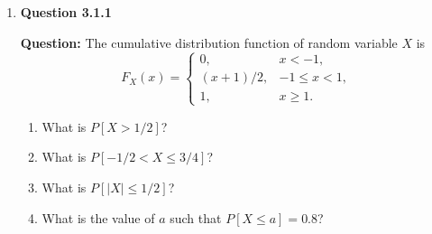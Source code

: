 \documentclass[12pt]{article}
\begin{document}
\begin{enumerate}[label=\textbf{\arabic*.}, leftmargin=*]
\vspace{0.3in}

\textbf{Response:}

\textbf{1. Find $P_Y(y)$, the PMF of $Y$}

You begin with \$63. The strategy of doubling bets (Martingale) allows for a maximum sequence of 6 bets ($1 + 2 + 4 + 8 + 16 + 32 = 63$).

\textbf{Case 1: You lose everything ($Y=0$).}

This occurs only if you lose 6 consecutive bets.
\[
P(Y=0) = \left(\frac{1}{2}\right)^6 = \frac{1}{64}
\]

\textbf{Case 2: You win ($Y=64$).}

This occurs if you win any single bet before running out of money.
\[
P(Y=64) = 1 - P(Y=0) = 1 - \frac{1}{64} = \frac{63}{64}
\]

The PMF is:
\[
P_Y(y) =
\begin{cases}
\frac{63}{64} & y = 64 \\
\frac{1}{64} & y = 0 \\
0 & \text{otherwise}
\end{cases}
\]

\textbf{2. Find $E[Y]$}

\[
E[Y] = \sum y \cdot P_Y(y)
\]
\[
E[Y] = \left(64 \cdot \frac{63}{64}\right) + \left(0 \cdot \frac{1}{64}\right)
\]
\[
E[Y] = 63 + 0
\]
\[
E[Y] = 63
\]

\textbf{3. Would you like to play this game every day?}

No. Even though the probability of winning is high ($98.4\%$), the expected profit is zero ($E[Y] = \$63$, which is exactly what you started with). You are risking your entire bankroll of \$63 to gain just \$1. Over time, the single catastrophic loss of \$63 (which happens on average once every 64 days) will wipe out all the small \$1 wins accumulated.



\newpage
\item \textbf{Question 3.1.1}

\textbf{Question:} The cumulative distribution function of random variable $X$ is
\[
F_X(x) = \begin{cases}
0, & x < -1, \\
(x+1)/2, & -1 \le x < 1, \\
1, & x \ge 1.
\end{cases}
\]
\begin{enumerate}[label=(\alph*)]
    \item What is $P[X > 1/2]$?
    \item What is $P[-1/2 < X \le 3/4]$?
    \item What is $P[|X| \le 1/2]$?
    \item What is the value of $a$ such that $P[X \le a] = 0.8$?
\end{enumerate}


\end{enumerate}
\end{document}

